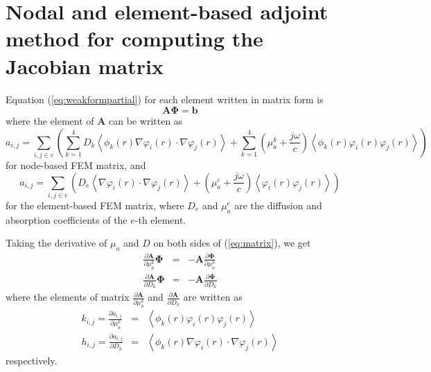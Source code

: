 \documentclass[12pt]{book}               %
\begin{document}
\section{Nodal and element-based adjoint method for computing the Jacobian matrix}
Equation (\ref{eq:weakformpartial}) for each element written in
matrix form is
\begin{equation}
\label{eq:matrix} \mathbf{A}{\boldsymbol\Phi}=\mathbf{b}
\end{equation}
where the element of $\mathbf{A}$ can be written as
\begin{equation}
a_{i,j}=\sum_{i,j\in e}\left(\sum_{k=1}^4D_k\left\langle
\phi_k(r)\nabla\varphi_i(r)\cdot\nabla\varphi_j(r)\right\rangle+\sum_{k=1}^4\left(\mu_{a}^k+\frac{j\omega}{c}\right)\left\langle\phi_k(r)\varphi_i(r)\varphi_j(r)\right\rangle\right)
\end{equation}
for node-based FEM matrix, and 
\begin{equation}
a_{i,j}=\sum_{i,j\in e}\left(D_e\left\langle
\nabla\varphi_i(r)\cdot\nabla\varphi_j(r)\right\rangle+\left(\mu_{a}^{e}+\frac{j\omega}{c}\right)\left\langle\varphi_i(r)\varphi_j(r)\right\rangle\right)
\end{equation}
for the element-based FEM matrix, where $D_e$ and $\mu_a^{e}$ are the diffusion and absorption coefficients 
of the $e$-th element.

Taking the derivative of $\mu_a$ and $D$ on both sides of
(\ref{eq:matrix}), we get
\begin{eqnarray}
\frac{\partial \mathbf{A}}{\partial
\mu_a^k}{\boldsymbol\Phi}&=&-\mathbf{A}\frac{\partial {\boldsymbol\Phi}}{\partial \mu_a^k}\\
\frac{\partial \mathbf{A}}{\partial
D_k}{\boldsymbol\Phi}&=&-\mathbf{A}\frac{\partial {\boldsymbol\Phi}}{\partial
D_k}
\end{eqnarray}
where the elements of matrix $\frac{\partial \mathbf{A}}{\partial
\mu_a^k}$ and $\frac{\partial \mathbf{A}}{\partial D_k}$ are
written as
\begin{eqnarray}
k_{i,j}=\frac{\partial
a_{i,j}}{\partial \mu_a^k}&=&\left\langle\phi_k(r)\varphi_i(r)\varphi_j(r)\right\rangle\\
h_{i,j}=\frac{\partial a_{i,j}}{\partial D_k}&=&\left\langle
\phi_k(r)\nabla\varphi_i(r)\cdot\nabla\varphi_j(r)\right\rangle
\end{eqnarray}
respectively.
\end{document}
